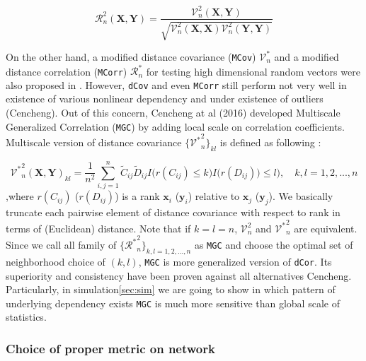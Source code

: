\documentclass[12pt]{article}
\theoremstyle{definition}
\begin{document}
\begin{equation}	 
\mathcal{R}_{n}^{2} (\boldsymbol{X}, \boldsymbol{Y}) = \frac{\mathcal{V}^2_{n} (\boldsymbol{X}, \boldsymbol{Y}) }{\sqrt{\mathcal{V}^2_{n} (\boldsymbol{X}, \boldsymbol{X}) \mathcal{V}^2_{n} (\boldsymbol{Y}, \boldsymbol{Y}) } }
\end{equation}
	
On the other hand, a modified distance covariance (\texttt{MCov}) $\mathcal{V}^*_{n}$ and a modified distance correlation (\texttt{MCorr}) $\mathcal{R}^{*}_{n}$ for testing high dimensional random vectors were also proposed in \cite{szekely2013distance}.   
However, \texttt{dCov} and even \texttt{MCorr} still perform not very well in existence of various nonlinear dependency and under existence of outliers (Cencheng). Out of this concern, Cencheng at al (2016) developed Multiscale Generalized Correlation (\texttt{MGC}) by adding local scale on correlation coefficients. Multiscale version of distance covariance $\{ { {\mathcal{V}^{*}}^2_{n} }   \}_{kl}$ is defined as following : 
	
\begin{equation}
\label{eq:MGC}
{\mathcal{V}^{*}}^2_{n} (\boldsymbol{X}, \boldsymbol{Y})_{kl} = \frac{1}{n^2} \sum\limits_{i,j=1}^{n} \tilde{C}_{ij} \tilde{D}_{ij} I \big( r(C_{ij}) \leq k \big) I \big( r(D_{ij})) \leq l  \big), \quad k,l=1,2,..., n 
\end{equation}
,where $r(C_{ij})$ ($r(D_{ij})$) is a rank $\mathbf{x}_{i}$ ($\mathbf{y}_{i}$) relative to $\mathbf{x}_{j}$ ($\mathbf{y}_{j}$). We basically truncate each pairwise element of distance covariance with respect to rank in terms of (Euclidean) distance. Note that if $k=l=n$, $\mathcal{V}^2_{n}$ and ${\mathcal{V}^{*}}^2_{n}$ are equivalent. Since we call all family of $\{  {\mathcal{R}^{*}}^2_{n} \}_{k,l = 1,2,...,n}$ as \texttt{MGC} and choose the optimal set of neighborhood choice of $(k,l)$, \texttt{MGC} is more generalized version of \texttt{dCor}. Its superiority and consistency have been proven against all alternatives Cencheng. Particularly, in simulation\ref{sec:sim} we are going to show in which pattern of underlying dependency exists \texttt{MGC} is much more sensitive than global scale of statistics. 
	
	
\subsubsection{Choice of proper metric on network}
\end{document}
